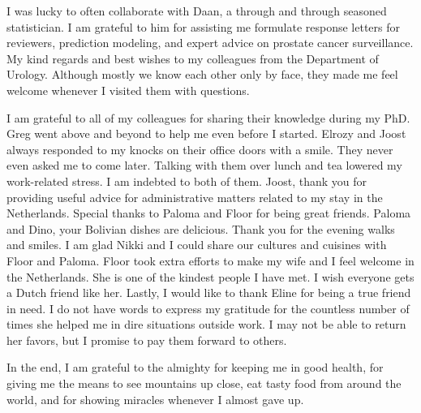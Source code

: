 I was lucky to often collaborate with Daan, a through and through seasoned statistician. I am grateful to him for assisting me formulate response letters for reviewers, prediction modeling, and expert advice on prostate cancer surveillance. My kind regards and best wishes to my colleagues from the Department of Urology. Although mostly we know each other only by face, they made me feel welcome whenever I visited them with questions.

I am grateful to all of my colleagues for sharing their knowledge during my PhD. Greg went above and beyond to help me even before I started. Elrozy and Joost always responded to my knocks on their office doors with a smile. They never even asked me to come later. Talking with them over lunch and tea lowered my work-related stress. I am indebted to both of them. Joost, thank you for providing useful advice for administrative matters related to my stay in the Netherlands. Special thanks to Paloma and Floor for being great friends. Paloma and Dino, your Bolivian dishes are delicious. Thank you for the evening walks and smiles. I am glad Nikki and I could share our cultures and cuisines with Floor and Paloma. Floor took extra efforts to make my wife and I feel welcome in the Netherlands. She is one of the kindest people I have met. I wish everyone gets a Dutch friend like her. Lastly, I would like to thank Eline for being a true friend in need. I do not have words to express my gratitude for the countless number of times she helped me in dire situations outside work. I may not be able to return her favors, but I promise to pay them forward to others.

In the end, I am grateful to the almighty for keeping me in good health, for giving me the means to see mountains up close, eat tasty food from around the world, and for showing miracles whenever I almost gave up.